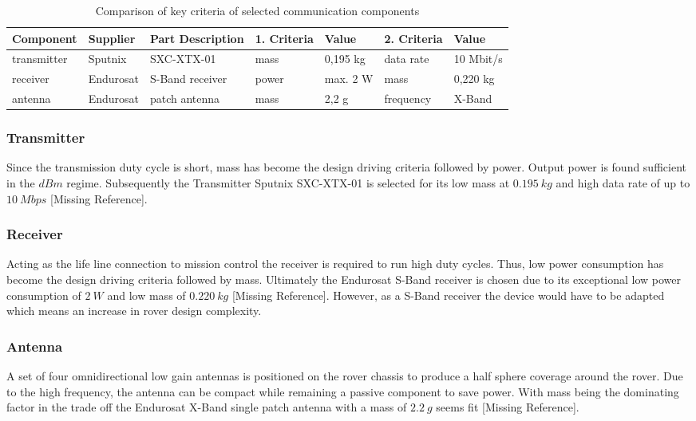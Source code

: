 \begin{table}[h]
\centering
\begin{tabular}{lll|ll|ll}
Component   & Supplier  & Part Description     & 1. Criteria   & Value    & 2. Criteria & Value          \\ \hline\hline
transmitter & Sputnix   & SXC-XTX-01           & mass          & 0,195 kg & data rate   & 10 Mbit/s \\
receiver    & Endurosat & S-Band receiver      & power         & max. 2 W & mass        & 0,220 kg       \\
antenna     & Endurosat & patch antenna & mass          & 2,2 g    & frequency   & X-Band         \\ \hline
\end{tabular}
\caption{Comparison of key criteria of selected communication components }
\label{tab:ComCompComp}
\end{table}

\subsubsection{Transmitter}

Since the transmission duty cycle is short, mass has become the design driving criteria followed by power. Output power is found sufficient in the $dBm$ regime. 
Subsequently the Transmitter Sputnix SXC-XTX-01 is selected for its low mass at $0.195\ kg$ and high data rate of up to $10\ Mbps$ [Missing Reference]. 

\subsubsection{Receiver}

Acting as the life line connection to mission control the receiver is required to run high duty cycles. Thus, low power consumption has become the design driving criteria followed by mass. Ultimately the Endurosat S-Band receiver is chosen due to its exceptional low power consumption of $2\ W$ and low mass of $0.220\ kg$ [Missing Reference]. However, as a S-Band receiver the device would have to be adapted which means an increase in rover design complexity.

\subsubsection{Antenna}

A set of four omnidirectional low gain antennas is positioned on the rover chassis to produce a half sphere coverage around the rover. Due to the high frequency, the antenna can be compact while remaining a passive component to save power. With mass being the dominating factor in the trade off the Endurosat X-Band single patch antenna with a mass of $2.2\ g$ seems fit [Missing Reference].

